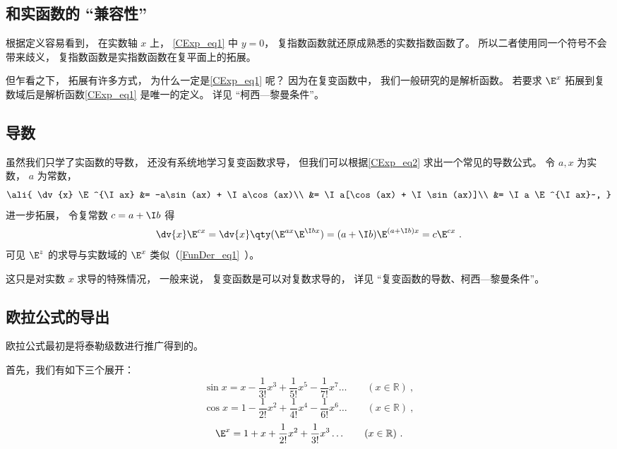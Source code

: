 \subsection{和实函数的 “兼容性”}
根据定义容易看到， 在实数轴 $x$ 上， \autoref{CExp_eq1} 中 $y = 0$， 复指数函数就还原成熟悉的实数指数函数了。 所以二者使用同一个符号不会带来歧义， 复指数函数是实指数函数在复平面上的拓展。

但乍看之下， 拓展有许多方式， 为什么一定是\autoref{CExp_eq1} 呢？ 因为在复变函数中， 我们一般研究的是解析函数。 若要求 $\E^x$ 拓展到复数域后是解析函数\autoref{CExp_eq1} 是唯一的定义。 详见 “柯西—黎曼条件”。

\subsection{导数}
虽然我们只学了实函数的导数， 还没有系统地学习复变函数求导， 但我们可以根据\autoref{CExp_eq2} 求出一个常见的导数公式。 令 $a, x$ 为实数， $a$ 为常数，
\begin{equation}\ali{
\dv{x} \E^{\I ax} &= -a\sin(ax) + \I a\cos(ax)\\
&= \I a[\cos(ax) + \I \sin(ax)]\\
&= \I a \E^{\I ax}~,
}\end{equation}
进一步拓展， 令复常数 $c = a + \I b$ 得
\begin{equation}
\dv{x}\E^{c x} = \dv{x} \qty(\E^{ax}\E^{\I bx}) = (a + \I b)\E^{(a+\I b)x} = c\E^{cx}~.
\end{equation}
可见 $\E^z$ 的求导与实数域的 $\E^x$ 类似（\autoref{FunDer_eq1}~）。

这只是对实数 $x$ 求导的特殊情况， 一般来说， 复变函数是可以对复数求导的， 详见 “复变函数的导数、柯西—黎曼条件”。

\subsection{欧拉公式的导出}


欧拉公式最初是将泰勒级数进行推广得到的。

首先，我们有如下三个展开：
\begin{equation}\label{CExp_eq3}
\sin x = x - \frac{1}{3!} x^3 + \frac{1}{5!} x^5 - \frac{1}{7!} x^7 \ldots
\qquad (x \in \mathbb R)~,
\end{equation}
\begin{equation}\label{CExp_eq5}
\cos x = 1 - \frac{1}{2!} x^2 + \frac{1}{4!} x^4 -\frac{1}{6!} x^6 \ldots
\qquad (x \in \mathbb R)~,
\end{equation}
\begin{equation}
\E^x =1 + x + \frac{1}{2!} x^2 + \frac{1}{3!} x^3  \ldots
\qquad (x \in \mathbb R)~.
\end{equation}

